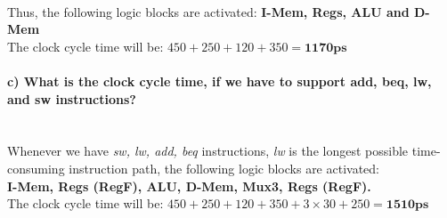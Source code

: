 \documentclass[a4paper]{article}
\newcommand{\solution}{\pagebreak[2]{\bf Solution:}\\}
\begin{document}
\\ 
Thus, the following logic blocks are activated: \textbf{I-Mem, Regs, ALU and D-Mem}\\
The clock cycle time will be: $450+250+120+350=\mathbf{1170ps}$\\
\\
\textbf{c) What is the clock cycle time, if we have to support add, beq, lw, and sw instructions?}\\
\\
\solution
Whenever we have \textit{sw, lw, add, beq} instructions, \textit{lw} is the longest possible time-consuming instruction path, the following logic blocks are activated:\\
\textbf{I-Mem, Regs (RegF), ALU, D-Mem, Mux3, Regs (RegF).}\\
The clock cycle time will be:
$450+250+120+350+3\times 30+250=\mathbf{1510ps}$
\end{document}
